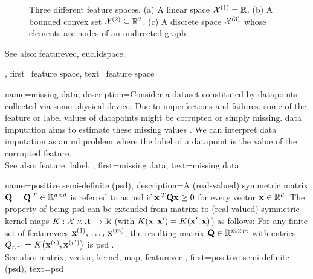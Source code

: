 {{\begin{figure}[H]
		\caption{Three different \gls{feature} spaces. (a) A linear space $\mathcal{X}^{(1)} = \mathbb{R}$. (b) A 
		bounded \gls{convex} set $\mathcal{X}^{(2)} \subseteq \mathbb{R}^{2}$. (c) A discrete space 
		$\mathcal{X}^{(3)}$ whose elements are nodes of an undirected \gls{graph}. \label{fig_featurespace_dict}}
		\end{figure}
		See also: \gls{featurevec}, \gls{euclidspace}.},
	first={feature space},
	text={feature space}  
}


{name={missing data},
	description={Consider a \gls{dataset} constituted by \glspl{datapoint} collected via 
		some physical \gls{device}. Due to imperfections and failures, some of the \gls{feature} 
		or \gls{label} values of \glspl{datapoint} might be corrupted or simply missing. 
		\Gls{data} imputation aims to estimate these missing values \cite{Abayomi2008DiagnosticsFM}. 
		We can interpret \gls{data} imputation as an \gls{ml} problem where the \gls{label} of a \gls{datapoint} is 
		the value of the corrupted \gls{feature}.
				\\
		See also: \gls{feature}, \gls{label}. },
	first={missing data},
	text={missing data}  
}


{name={positive semi-definite (psd)},
	description={A (real-valued) symmetric \gls{matrix} $\mathbf{Q} = \mathbf{Q}\,^{T} \in \mathbb{R}^{d \times d}$ 
	 	is referred to as psd if ${\bf x}\,^{T} \mathbf{Q} {\bf x} \geq 0$ for every \gls{vector} ${\bf x} \in \mathbb{R}^{d}$. 
	 	The property of being psd can be extended from \glspl{matrix} to (real-valued) 
	 	symmetric \gls{kernel} \glspl{map} $K: \mathcal{X} \times \mathcal{X} \rightarrow \mathbb{R}$ 
	 	(with $K({\bf x},{\bf x}') = K({\bf x}',{\bf x})$)
	 	as follows: For any finite set of \glspl{featurevec} ${\bf x}^{(1)}, \,\ldots, \,{\bf x}^{(m)}$, 
	 	the resulting \gls{matrix} $\mathbf{Q} \in \mathbb{R}^{m \times m}$ with 
		entries $Q_{r,r'} = K\big({\bf x}^{(r)},{\bf x}^{(r')}\big)$ 
		is psd \cite{LearningKernelsBook}.
			\\
		See also: \gls{matrix}, \gls{vector}, \gls{kernel}, \gls{map}, \gls{featurevec}.},
	first={positive semi-definite (psd)},
	text={psd}  
}

